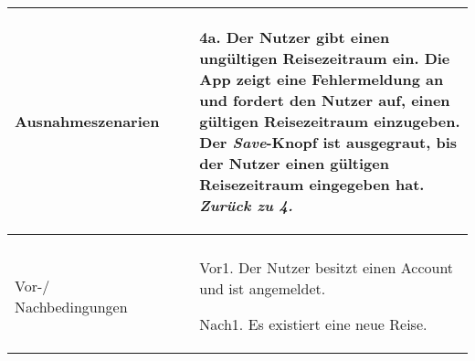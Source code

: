 \begin{table}[H]
\begin{tabularx}{0.95\textwidth}{ |l|X| }
		\hline
		Ausnahmeszenarien                      & \begin{enumerate}
			                                         \item[4a.] Der Nutzer gibt einen ungültigen Reisezeitraum ein.
				                                         \subitem[4a1.] Die App zeigt eine Fehlermeldung an und fordert den Nutzer auf, einen gültigen Reisezeitraum einzugeben.
				                                         \subitem[4a2.] Der \emph{Save}-Knopf ist ausgegraut, bis der Nutzer einen gültigen Reisezeitraum eingegeben hat. \emph{Zurück zu 4.}
		                                         \end{enumerate} \\
		\hline
		\rowcolor{lightgray}                   &                                                                                                                                     \\
		\hline
		Vor-/ Nachbedingungen                  & \begin{enumerate}
			                                         \item[Vor1.] Der Nutzer besitzt einen Account und ist angemeldet.
			                                         \item[Nach1.] Es existiert eine neue Reise.
		                                         \end{enumerate}                                                                    \\
		\hline
	\end{tabularx}
\end{table}

